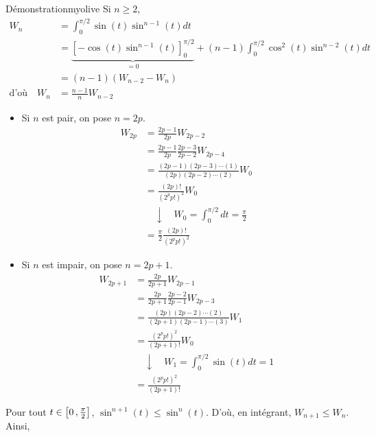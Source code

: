 \begin{demo}{Démonstration}{myolive}
            Si $n \geq 2$, 
            \begin{align*}
                W_n 
                &= \int_{0}^{\pi / 2} \sin(t) \sin^{n-1} (t) dt \\
                &= \underbrace{\left[ - \cos(t) \sin^{n-1}(t) \right]_0^{\pi / 2}}_{= 0} + (n-1) \int_{0}^{\pi / 2} \cos^2(t) \sin^{n-2}(t) dt \\
                &= (n-1) \left( W_{n-2} - W_n\right) \\
                \text{d’où} \quad W_n 
                &= \frac{n-1}{n} W_{n-2}
            \end{align*}
            \begin{itemize}
                \item Si $n$ est pair, on pose $n = 2p$.
                \begin{align*}
                    W_{2p} 
                    &= \frac{2p-1}{2p} W_{2p-2} \\
                    &= \frac{2p-1}{2p} \frac{2p-3}{2p-2} W_{2p-4} \\
                    &= \frac{(2p-1)(2p-3)\cdots(1)}{(2p)(2p-2)\cdots(2)} W_0 \\
                    &= \frac{(2p)!}{(2^p p!)^2} W_0 \\
                    & \quad \downarrow \quad W_0 = \int_{0}^{\pi / 2} dt = \frac{\pi}{2} \\
                    &= \frac{\pi}{2} \frac{(2p)!}{(2^p p!)^2} 
                \end{align*}
                \item Si $n$ est impair, on pose $n = 2p + 1$.
                \begin{align*}
                    W_{2p+1} 
                    &= \frac{2p}{2p+1} W_{2p-1} \\
                    &= \frac{2p}{2p+1} \frac{2p-2}{2p-1} W_{2p-3} \\
                    &= \frac{(2p)(2p-2)\cdots(2)}{(2p+1)(2p-1)\cdots(3)} W_1 \\
                    &= \frac{(2^p p!)^2}{(2p+1)!} W_0 \\
                    & \quad \downarrow \quad W_1 = \int_{0}^{\pi / 2} \sin(t)dt = 1 \\
                    &= \frac{(2^p p!)^2}{(2p+1)!} 
                \end{align*}
            \end{itemize}
            Pour tout $t \in \left[ 0 \, , \frac{\pi}{2} \right]$, $\sin^{n+1}(t) \leq \sin^n(t)$. D’où, en intégrant, $W_{n+1} \leq W_{n}$. Ainsi, 

\end{demo}
